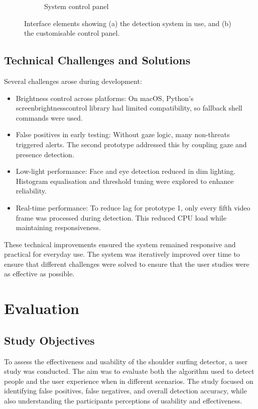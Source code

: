 \documentclass[12pt]{article}
\theoremstyle{plain}
\theoremstyle{definition}
\begin{document}
\begin{figure}
\begin{subfigure}[c]{0.45\textwidth}
    \caption{System control panel}
    \label{fig:gui_controls}
  \end{subfigure}
  \caption{Interface elements showing (a) the detection system in use, and (b) the customisable control panel.}
  \label{fig:gui_overview}
\end{figure}

\subsection{Technical Challenges and Solutions}
\label{challenges}

Several challenges arose during development:
\begin{itemize}
  \item Brightness control across platforms: On macOS, Python’s screen\textunderscore brightness\textunderscore control library had limited compatibility, so fallback shell commands were used.
  \item False positives in early testing: Without gaze logic, many non-threats triggered alerts. The second prototype addressed this by coupling gaze and presence detection.
  \item Low-light performance: Face and eye detection reduced in dim lighting. Histogram equalisation and threshold tuning were explored to enhance reliability.
  \item Real-time performance: To reduce lag for prototype 1, only every fifth video frame was processed during detection. This reduced CPU load while maintaining responsiveness.
\end{itemize}

These technical improvements ensured the system remained responsive and practical for everyday use. The system was iteratively improved over time to ensure that different challenges were solved to ensure that the user studies were as effective as possible.

\section{Evaluation}
\label{evaluation}

\subsection{Study Objectives}
\label{study_objectives}

To assess the effectiveness and usability of the shoulder surfing detector, a user study was conducted. The aim was to evaluate both the algorithm used to detect people and the user experience when in different scenarios. The study focused on identifying false positives, false negatives, and overall detection accuracy, while also understanding the participants perceptions of usability and effectiveness.
\end{document}
